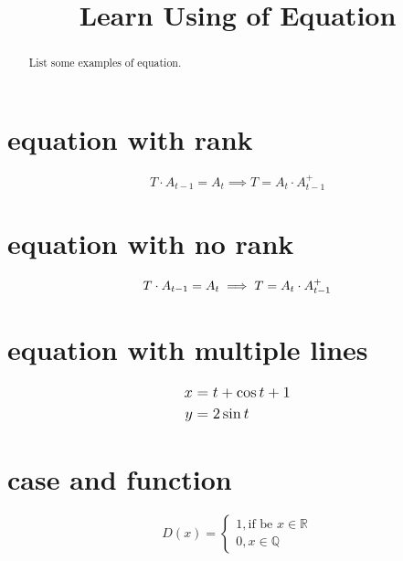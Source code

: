 \documentclass[a4paper]{article}
\begin{document}
    \title{Learn Using of Equation}
    \maketitle
    
    \begin{abstract}
        \vspace{20pt}
        {\large List some examples of equation.}
    \end{abstract}

    \section{equation with rank}
    \begin{equation}
        T \cdot A_{t-1}=A_t \implies T=A_t \cdot A_{t-1}^{+}
        \label{eq_pagerank}
    \end{equation}

    \section{equation with no rank}
    \begin{equation}
        T \cdot A_{t-1}=A_t \implies T=A_t \cdot A_{t-1}^{+}
        \notag%
    \end{equation}
    
    \section{equation with multiple lines}
    \begin{equation}
        {\large
        \begin{split}
            x &= t + \cos t +1\\
            y &= 2\sin t
        \end{split}}
    \end{equation}
        
    \section{case and function}
    \begin{equation}
        D(x) = \begin{cases}
            1,\text{if be } x\in \mathbb{R}\\
            0, x\in \mathbb{Q}
        \end{cases}
    \end{equation}
    
\end{document}
